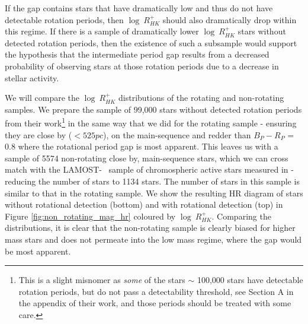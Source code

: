 If the gap contains stars that have dramatically low \rper{} and thus do not have detectable rotation periods, then $\log \ R^{+}_{HK}$ should also dramatically drop within this regime.
If there is a sample of dramatically lower $\log \ R^{+}_{HK}$ stars without detected rotation periods, then the existence of such a subsample would support the hypothesis that the intermediate period gap results from a decreased probability of observing stars at those rotation periods due to a decrease in stellar activity.


We will compare the $\log \ R^{+}_{HK}$ distributions of the \citet{mcquillan_rotation_2014} rotating and non-rotating samples.
We prepare the sample of 99,000 stars without detected rotation periods from their work\footnote{This is a slight misnomer as \textit{some} of the stars $\sim$ 100,000 stars have detectable rotation periods, but do not pass a detectability threshold, see Section A in the appendix of their work, and those periods should be treated with some care.} in the same way that we did for the rotating sample - ensuring they are close by ($<525 pc$), on the main-sequence and redder than $B_P-R_P$ = 0.8 where the rotational period gap is most apparent.
This leaves us with a sample of 5574 non-rotating close by, main-sequence stars, which we can cross match with the LAMOST-\kepler{} \ sample of chromospheric active stars measured in \citet{zhang_magnetic_2020} - reducing the number of stars to 1134 stars.
The number of stars in this sample is similar to that in the rotating sample.
We show the resulting HR diagram of stars without rotational detection (bottom) and with rotational detection (top) in Figure \ref{fig:non_rotating_mag_hr} coloured by $\log \ R^{+}_{HK}$.
Comparing the distributions, it is clear that the non-rotating sample is clearly biased for higher mass stars and does not permeate into the low mass regime, where the gap would be most apparent.

